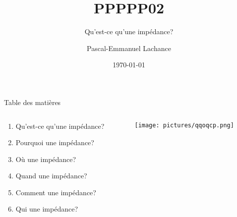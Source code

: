 \documentclass{beamer}
\author{Pascal-Emmanuel Lachance}
\title{PPPPP02}
\subtitle{Qu'est-ce qu'une impédance?}
\institute{Compétitions de Conception de Circuits Imprimés}
\date{\today}
\begin{document}

\begin{frame}[plain]
    \maketitle
\end{frame}



\begin{frame}{Table des matières}
    \begin{columns}[T]
        \begin{column}{0.66\textwidth}
            \Large{
            \begin{enumerate}
                \setlength\itemsep{8pt}
                \item Qu'est-ce qu'une impédance?
                \item Pourquoi une impédance?
                \item Où une impédance?
                \item Quand une impédance?
                \item Comment une impédance?
                \item Qui une impédance?
            \end{enumerate}
            }
        \end{column}
        \begin{column}{0.4\textwidth}
            \begin{figure}
                \texttt{[image: pictures/qqoqcp.png]}
            \end{figure}
        \end{column}
    \end{columns}
\end{frame}
\end{document}
